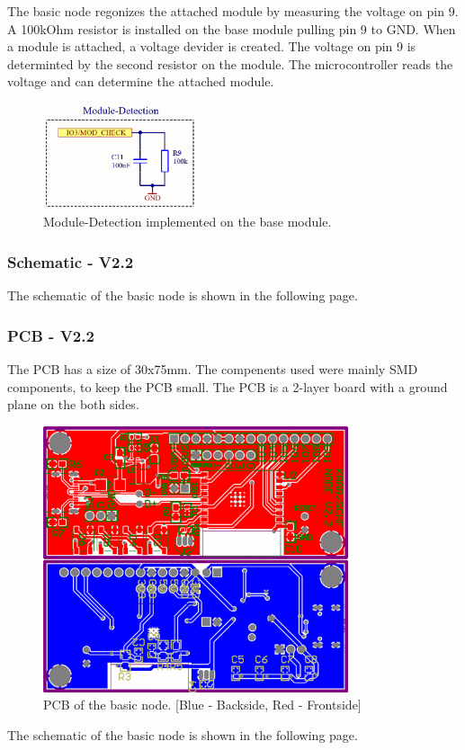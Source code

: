     The basic node regonizes the attached module by measuring the voltage on pin 9.
    A 100kOhm resistor is installed on the base module pulling pin 9 to GND. 
    When a module is attached, a voltage devider is created. The voltage on pin 9 is 
    determinted by the second resistor on the module. The microcontroller reads the
    voltage and can determine the attached module. 
    
    \begin{figure}[H]
        \centering
        \includegraphics[width=0.4\textwidth]{assets/HW/Node-Module-Check.png}
        \caption{Module-Detection implemented on the base module.}
    \end{figure}
    
    
    
    \subsubsection{Schematic - V2.2}
    The schematic of the basic node is shown in the following page.
    
    

    \subsubsection{PCB - V2.2}

    The PCB has a size of 30x75mm. The compenents used were mainly SMD components, 
    to keep the PCB small. The PCB is a 2-layer board with a ground plane on the
    both sides.

    \begin{figure}[H]
        \centering
        \includegraphics[width=0.8\textwidth]{assets/HW/PCB-NODE-V2.2.png}
        \caption{PCB of the basic node. [Blue - Backside, Red - Frontside]}
    \end{figure}	

    


    The schematic of the basic node is shown in the following page.
    
 

